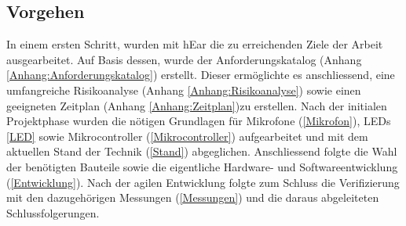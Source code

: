 \documentclass[12pt]{article}
\begin{document}
	\subsection{Vorgehen}
	In einem ersten Schritt, wurden mit hEar die zu erreichenden Ziele der Arbeit ausgearbeitet. Auf Basis dessen, wurde der Anforderungskatalog (Anhang \ref{Anhang:Anforderungskatalog}) erstellt. Dieser ermöglichte es anschliessend, eine umfangreiche Risikoanalyse (Anhang \ref{Anhang:Risikoanalyse}) sowie einen geeigneten Zeitplan (Anhang \ref{Anhang:Zeitplan})zu erstellen. Nach der initialen Projektphase wurden die nötigen Grundlagen für Mikrofone (\ref{Mikrofon}), LEDs \ref{LED} sowie Mikrocontroller (\ref{Mikrocontroller}) aufgearbeitet und mit dem aktuellen Stand der Technik (\ref{Stand}) abgeglichen. Anschliessend folgte die Wahl der benötigten Bauteile sowie die eigentliche Hardware- und Softwareentwicklung (\ref{Entwicklung}). Nach der agilen Entwicklung folgte zum Schluss die Verifizierung mit den dazugehörigen Messungen (\ref{Messungen}) und die daraus abgeleiteten Schlussfolgerungen. \\
	
	\newpage
\end{document}
